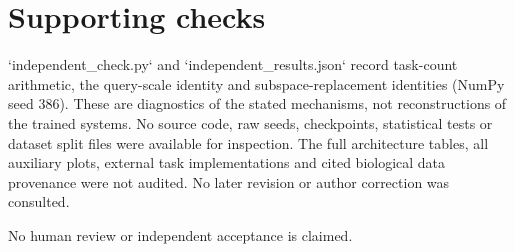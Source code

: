 \documentclass[10pt]{article}
\begin{document}
\section*{Supporting checks}
`independent\_check.py` and `independent\_results.json` record task-count arithmetic, the query-scale identity and subspace-replacement identities (NumPy seed 386). These are diagnostics of the stated mechanisms, not reconstructions of the trained systems. No source code, raw seeds, checkpoints, statistical tests or dataset split files were available for inspection. The full architecture tables, all auxiliary plots, external task implementations and cited biological data provenance were not audited. No later revision or author correction was consulted.\par
No human review or independent acceptance is claimed.\par
\end{document}
